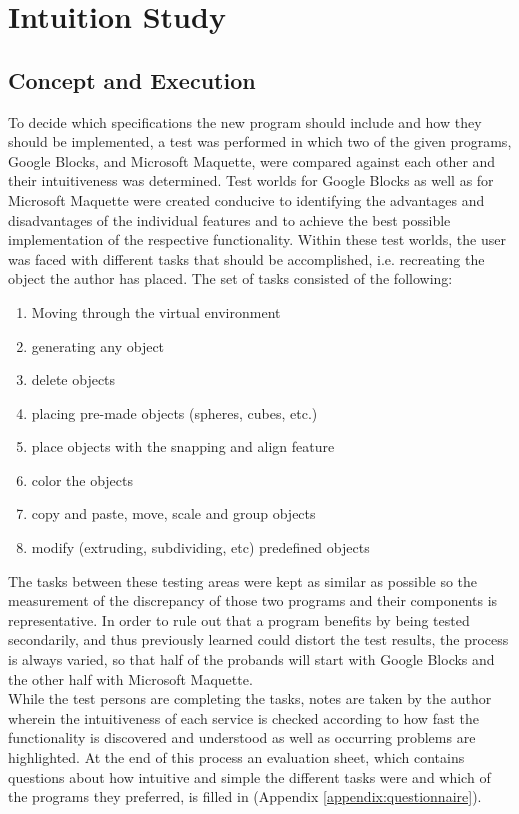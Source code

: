 \documentclass{report}
\begin{document}
\chapter{Intuition Study}
	
	\section{Concept and Execution}	
	\startsection				
		To decide which specifications the new program should include and how they should be implemented, a test was performed in which two of the given programs, Google Blocks, and Microsoft Maquette, were compared against each other and their intuitiveness was determined. Test worlds for Google Blocks as well as for Microsoft Maquette were created conducive to identifying the advantages and disadvantages of the individual features and to achieve the best possible implementation of the respective functionality. Within these test worlds, the user was faced with different tasks that should be accomplished, i.e. recreating the object the author has placed. The set of tasks consisted of the following:
		\begin{enumerate}[-]
			\item Moving through the virtual environment
			\item generating any object
			\item delete objects
			\item placing pre-made objects (spheres, cubes, etc.)
			\item place objects with the snapping and align feature
			\item color the objects
			\item copy and paste, move, scale and group objects
			\item modify (extruding, subdividing, etc) predefined objects
		\end{enumerate}		
		The tasks between these testing areas were kept as similar as possible so the measurement of the discrepancy of those two programs and their components is representative. In order to rule out that a program benefits by being tested secondarily, and thus previously learned could distort the test results, the process is always varied, so that half of the probands will start with Google Blocks and the other half with Microsoft Maquette. \\
		While the test persons are completing the tasks, notes are taken by the author wherein the intuitiveness of each service is checked according to how fast the functionality is discovered and understood as well as occurring problems are highlighted. At the end of this process an evaluation sheet, which contains questions about how intuitive and simple the different tasks were and which of the programs they preferred, is filled in (Appendix \ref{appendix:questionnaire}).
	\closesection
\end{document}
